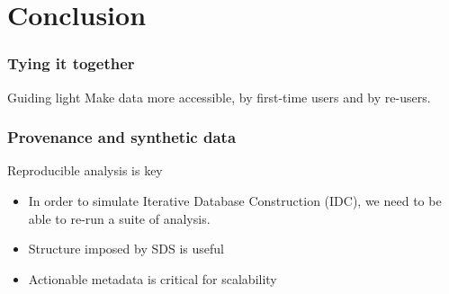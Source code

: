 \section{Conclusion}

\begin{frame}
	\frametitle{Tying it together}
	\begin{block}{Guiding light}
		Make data more accessible, by first-time users and by re-users.
	\end{block}
\end{frame}

\begin{frame}
	\frametitle{Provenance and synthetic data}
	\begin{block}{Reproducible analysis is key}
\begin{itemize}
	\item In order to simulate		Iterative Database Construction (IDC), we need to be able to re-run a suite of analysis.
	\item Structure imposed by \ac{SDS} is useful
	\item Actionable metadata is critical for scalability
\end{itemize}
	\end{block}
\end{frame}

